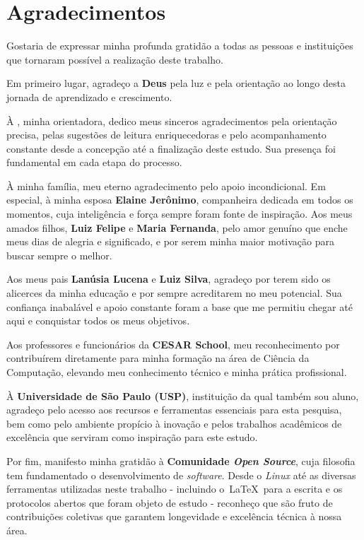 \chapter*{Agradecimentos}
\thispagestyle{empty}

Gostaria de expressar minha profunda gratidão a todas as pessoas e instituições que tornaram possível a realização deste trabalho.

Em primeiro lugar, agradeço a \textbf{Deus} pela luz e pela orientação ao longo desta jornada de aprendizado e crescimento.

À \textbf{\orientadora}, minha orientadora, dedico meus sinceros agradecimentos pela orientação precisa, pelas sugestões de leitura enriquecedoras e pelo acompanhamento constante desde a concepção até a finalização deste estudo. Sua presença foi fundamental em cada etapa do processo.

À minha família, meu eterno agradecimento pelo apoio incondicional. Em especial, à minha esposa \textbf{Elaine Jerônimo}, companheira dedicada em todos os momentos, cuja inteligência e força sempre foram fonte de inspiração. Aos meus amados filhos, \textbf{Luiz Felipe} e \textbf{Maria Fernanda}, pelo amor genuíno que enche meus dias de alegria e significado, e por serem minha maior motivação para buscar sempre o melhor.

Aos meus pais \textbf{Lanúsia Lucena} e \textbf{Luiz Silva}, agradeço por terem sido os alicerces da minha educação e por sempre acreditarem no meu potencial. Sua confiança inabalável e apoio constante foram a base que me permitiu chegar até aqui e conquistar todos os meus objetivos.

Aos professores e funcionários da \textbf{CESAR School}, meu reconhecimento por contribuírem diretamente para minha formação na área de Ciência da Computação, elevando meu conhecimento técnico e minha prática profissional.

À \textbf{Universidade de São Paulo (USP)}, instituição da qual também sou aluno, agradeço pelo acesso aos recursos e ferramentas essenciais para esta pesquisa, bem como pelo ambiente propício à inovação e pelos trabalhos acadêmicos de excelência que serviram como inspiração para este estudo.

Por fim, manifesto minha gratidão à \textbf{Comunidade \textit{Open Source}}, cuja filosofia tem fundamentado o desenvolvimento de \textit{software}. Desde o \textit{Linux} até as diversas ferramentas utilizadas neste trabalho - incluindo o~\LaTeX~para a escrita e os protocolos abertos que foram objeto de estudo - reconheço que são fruto de contribuições coletivas que garantem longevidade e excelência técnica à nossa área.
